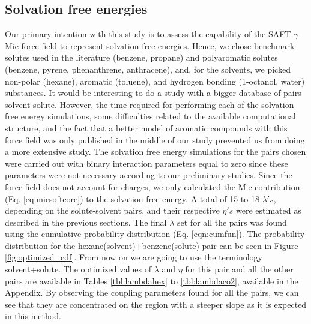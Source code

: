 \documentclass[final,12p,times,twocolumn]{elsarticle}
\begin{document}
	\subsection{Solvation free energies}
	
	Our primary intention with this study is to assess the capability of the SAFT-$\gamma$ Mie force field to represent solvation free energies. Hence, we chose benchmark solutes used in the literature (benzene, propane) and polyaromatic solutes (benzene, pyrene, phenanthrene, anthracene), and, for the solvents, we picked non-polar (hexane), aromatic (toluene), and hydrogen bonding (1-octanol, water) substances. It would be interesting to do a study with a bigger database of pairs solvent-solute. However, the time required for performing each of the solvation free energy simulations, some difficulties related to the available computational structure, and the fact that a better model of aromatic compounds with this force field was only published in the middle of our study prevented us from doing a more extensive study. The solvation free energy simulations for the pairs chosen were carried out with binary interaction parameters equal to zero since these parameters were not necessary according to our preliminary studies. Since the force field does not account for charges, we only calculated the Mie contribution (Eq. \ref{eq:miesoftcore}) to the solvation free energy. A total of 15 to 18 $\lambda 's$, depending on the solute-solvent pairs, and their respective $\eta 's$ were estimated as described in the previous sections. The final $\lambda$ set for all the pairs was found using the cumulative probability distribution (Eq. \eqref{eqn:cumfun}). The probability distribution for the hexane(solvent)+benzene(solute) pair can be seen in Figure \ref{fig:optimized_cdf}. From now on we are going to use the terminology solvent+solute. The optimized values of $\lambda$ and $\eta$ for this pair and all the other pairs are available in Tables \ref{tbl:lambdahex} to \ref{tbl:lambdaco2}, available in the Appendix. By observing the coupling parameters found for all the pairs, we can see that they are concentrated on the region with a steeper slope as it is expected in this method.
	
\end{document}

